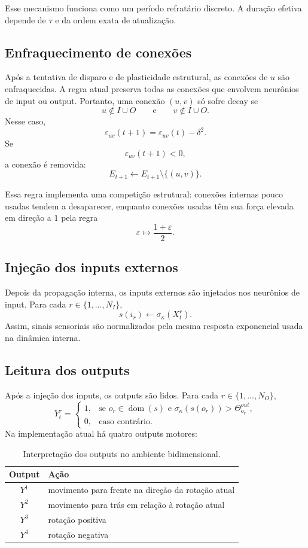 \documentclass[12pt,a4paper,fleqn]{article}
\begin{document}
Esse mecanismo funciona como um período refratário discreto. A duração efetiva depende de $\tau$ e da ordem exata de atualização.

\subsection{Enfraquecimento de conexões}

Após a tentativa de disparo e de plasticidade estrutural, as conexões de $u$ são enfraquecidas. A regra atual preserva todas as conexões que envolvem neurônios de input ou output. Portanto, uma conexão $(u,v)$ só sofre decay se
$$
	u\notin I\cup O
	\qquad\text{e}\qquad
	v\notin I\cup O.
$$
Nesse caso,
$$
	\varepsilon_{uv}(t+1)=\varepsilon_{uv}(t)-\delta^2.
$$
Se
$$
	\varepsilon_{uv}(t+1)<0,
$$
a conexão é removida:
$$
	E_{t+1}\leftarrow E_{t+1}\setminus\{(u,v)\}.
$$

Essa regra implementa uma competição estrutural: conexões internas pouco usadas tendem a desaparecer, enquanto conexões usadas têm sua força elevada em direção a $1$ pela regra
$$
	\varepsilon\mapsto\frac{1+\varepsilon}{2}.
$$

\subsection{Injeção dos inputs externos}

Depois da propagação interna, os inputs externos são injetados nos neurônios de input. Para cada $r\in\{1,\ldots,N_I\}$,
$$
	s(i_r)\leftarrow \sigma_\kappa(X_t^r).
$$
Assim, sinais sensoriais são normalizados pela mesma resposta exponencial usada na dinâmica interna.

\subsection{Leitura dos outputs}

Após a injeção dos inputs, os outputs são lidos. Para cada $r\in\{1,\ldots,N_O\}$,
$$
	Y_t^r=
	\begin{cases}
		1, & \text{se } o_r\in\operatorname{dom}(s)\text{ e }\sigma_\kappa(s(o_r))>\Theta^{out}_{o_r},\\
		0, & \text{caso contrário.}
	\end{cases}
$$
Na implementação atual há quatro outputs motores:

\begin{table}[H]
\centering
\caption{Interpretação dos outputs no ambiente bidimensional.}
\label{tab:outputs}
\begin{tabular}{cl}
\toprule
Output & Ação \\
\midrule
$Y^1$ & movimento para frente na direção da rotação atual \\
$Y^2$ & movimento para trás em relação à rotação atual \\
$Y^3$ & rotação positiva \\
$Y^4$ & rotação negativa \\
\bottomrule
\end{tabular}
\end{table}
\end{document}
